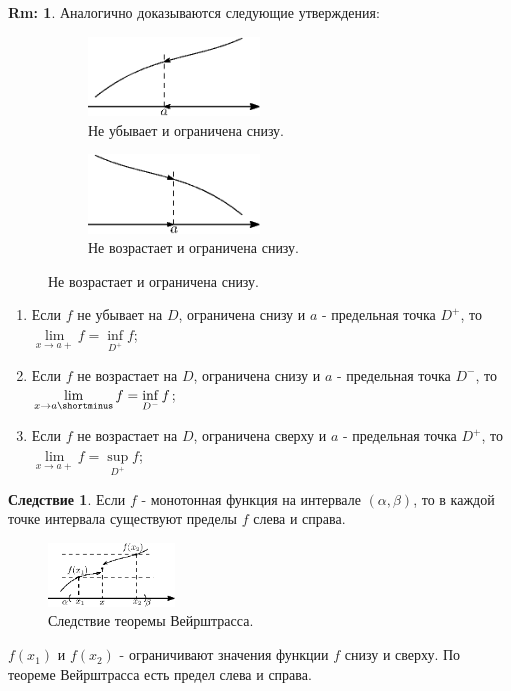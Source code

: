 \documentclass[12pt]{article}
\theoremstyle{definition}
\newtheorem{rem}{Rm:}
\newtheorem{corollary}{Следствие}
\begin{document}
\begin{rem}
	Аналогично доказываются следующие утверждения:
	\begin{figure}[H]
		\begin{subfigure}[b]{0.5\textwidth}
			\centering
			\includegraphics[width=0.5\textwidth]{15_7.eps}
			\caption{Не убывает и ограничена снизу.}
			\label{15_7}
		\end{subfigure}%
		\begin{subfigure}[b]{0.5\textwidth}
			\centering
			\includegraphics[width=0.5\textwidth]{15_8.eps}
			\caption{Не возрастает и ограничена снизу.}
			\label{15_8}
		\end{subfigure}
	\end{figure}
	\begin{enumerate}[label={\arabic*)}]
		\item Если $f$ не убывает на $D$, ограничена снизу и $a$ - предельная точка $D^+$, то $\lim\limits_{x \to a+}f = \inf\limits_{D^+}f$;
		\item Если $f$ не возрастает на $D$, ограничена снизу и $a$ - предельная точка $D^-$, то $\lim\limits_{x \to a\shortminus}f = \inf\limits_{D^-}f$;
		\item Если $f$ не возрастает на $D$, ограничена сверху и $a$ - предельная точка $D^+$, то $\lim\limits_{x \to a+}f = \sup\limits_{D^+}f$;
	\end{enumerate}
\end{rem}

\begin{corollary}
	Если $f$ - монотонная функция на интервале $(\alpha, \beta)$, то в каждой точке интервала существуют пределы $f$ слева и справа.
\end{corollary}

\begin{figure}[H]
	\centering
	\includegraphics[width=0.3\textwidth]{15_9.eps}
	\caption{Следствие теоремы Вейрштрасса. }
	\label{15_9}
\end{figure}
$f(x_1)$ и $f(x_2)$ - ограничивают значения функции $f$ снизу и сверху. По теореме Вейрштрасса есть предел слева и справа.
\end{document}

